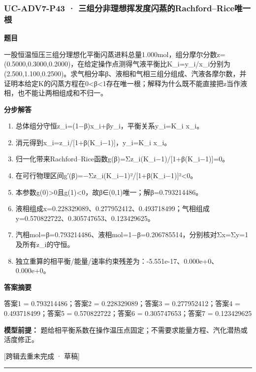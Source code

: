 \documentclass[UTF8,11pt,a4paper]{ctexart}
\begin{document}
\subsubsection*{UC-ADV7-P43 · 三组分非理想挥发度闪蒸的Rachford–Rice唯一根}
\noindent\textbf{题目}\par
一股恒温恒压三组分理想化平衡闪蒸进料总量1.000mol，组分摩尔分数z=(0.5000,0.3000,0.2000)，在给定操作点测得气液平衡比K\_i=y\_i/x\_i分别为(2.500,1.100,0.2500)。求气相分率β、液相和气相三组分组成、汽液各摩尔数，并证明本给定K的闪蒸方程在0<β<1存在唯一根；解释为什么既不能直接把z当作液相，也不能让两相组成和不归一。\par
\medskip\noindent\textbf{分步解答}
\begin{enumerate}
\item 总体组分守恒z\_i=(1−β)x\_i+βy\_i，平衡关系y\_i=K\_i x\_i。
\item 消元得到x\_i=z\_i/[1+β(K\_i−1)]，y\_i=K\_i x\_i。
\item 归一化带来Rachford–Rice函数g(β)=Σz\_i(K\_i−1)/[1+β(K\_i−1)]=0。
\item 在可行物理区间g′(β)=−Σz\_i(K\_i−1)²/[1+β(K\_i−1)]²<0。
\item 本参数g(0)>0且g(1)<0，故β∈(0,1)唯一；解β=0.793214486。
\item 液相组成x=0.228329089、0.277952412、0.493718499；气相组成y=0.570822722、0.305747653、0.123429625。
\item 汽相mol=β=0.793214486、液相mol=1−β=0.206785514，分别核对Σx=Σy=1及所有z\_i的守恒。
\item 独立重算的相平衡/能量/速率约束残差为：-5.551e-17、0.000e+0、0.000e+0。
\end{enumerate}
\noindent\textbf{答案摘要}\par
答案1 = 0.793214486；答案2 = 0.228329089；答案3 = 0.277952412；答案4 = 0.493718499；答案5 = 0.570822722；答案6 = 0.305747653；答案7 = 0.123429625\par
\noindent\textbf{模型前提：}
题给相平衡系数在操作温压点固定；不需要求能量方程、汽化潜热或活度修正。\par
\noindent\textcolor{red!65!black}{[跨辑去重未完成 · 草稿]} \par
\medskip\hrule\medskip
{}
\end{document}
